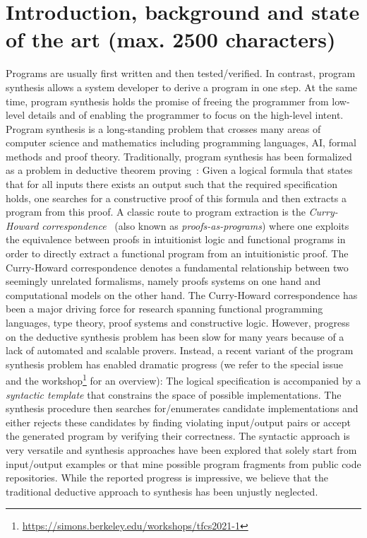 \documentclass[a4paper,12pt]{article}
\begin{document}
\section{Introduction, background and state of the art (max. 2500 characters)}
Programs are usually first written and then tested/verified.
In contrast, program synthesis allows a system developer to derive a program in one step.
At the same time, program synthesis holds the promise of freeing the programmer from low-level details and of enabling the programmer to focus on the high-level intent.
Program synthesis is a long-standing problem that crosses many areas of computer science and mathematics including programming languages, AI, formal methods and proof theory.
Traditionally, program synthesis has been formalized as a problem in deductive theorem proving~\cite{conf/ijcai/MannaW79}:
Given a logical formula that states that for all inputs there exists an output such that the required specification holds, one searches for a constructive proof of this formula and then extracts a program from this proof.
A classic route to program extraction is the \emph{Curry-Howard correspondence}~\cite{?} (also known as \emph{proofs-as-programs}) where one exploits the equivalence between proofs in intuitionist logic and functional programs in order to directly extract a functional program from an intuitionistic proof.
The Curry-Howard correspondence denotes a fundamental relationship between two seemingly unrelated formalisms, namely proofs systems on one hand and computational models on the other hand.
The Curry-Howard correspondence has been a major driving force for research spanning functional programming languages, type theory, proof systems and constructive logic.
However, progress on the deductive synthesis problem has been slow for many years because of a lack of automated and scalable provers.
Instead, a recent variant of the program synthesis problem has enabled dramatic progress (we refer to the special issue~\cite{fisman2022special} and the workshop\footnote{\url{https://simons.berkeley.edu/workshops/tfcs2021-1}} for an overview):
The logical specification is accompanied by a \emph{syntactic template} that constrains the space of possible implementations.
The synthesis procedure then searches for/enumerates candidate implementations and either rejects these candidates by finding violating input/output pairs or accept the generated program by verifying their correctness.
The syntactic approach is very versatile and synthesis approaches have been explored that solely start from input/output examples or that mine possible program fragments from public code repositories.
While the reported progress is impressive, we believe that the traditional deductive approach to synthesis has been unjustly neglected.
\end{document}
